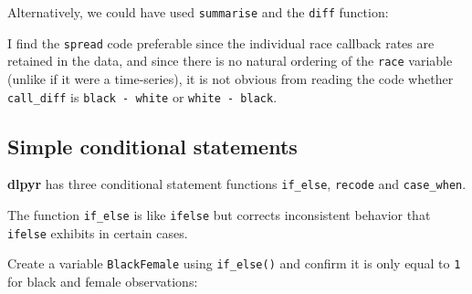 \documentclass[]{book}
\newenvironment{Shaded}{\begin{snugshade}}{\end{snugshade}}
\newcommand{\KeywordTok}[1]{\textcolor[rgb]{0.13,0.29,0.53}{\textbf{#1}}}
\newcommand{\DataTypeTok}[1]{\textcolor[rgb]{0.13,0.29,0.53}{#1}}
\newcommand{\DecValTok}[1]{\textcolor[rgb]{0.00,0.00,0.81}{#1}}
\newcommand{\StringTok}[1]{\textcolor[rgb]{0.31,0.60,0.02}{#1}}
\newcommand{\CommentTok}[1]{\textcolor[rgb]{0.56,0.35,0.01}{\textit{#1}}}
\newcommand{\OperatorTok}[1]{\textcolor[rgb]{0.81,0.36,0.00}{\textbf{#1}}}
\newcommand{\NormalTok}[1]{#1}
\theoremstyle{definition}
\theoremstyle{definition}
\theoremstyle{definition}
\theoremstyle{remark}
\begin{document}
Alternatively, we could have used \texttt{summarise} and the
\texttt{diff} function:

\begin{Shaded}
\end{Shaded}

I find the \texttt{spread} code preferable since the individual race
callback rates are retained in the data, and since there is no natural
ordering of the \texttt{race} variable (unlike if it were a
time-series), it is not obvious from reading the code whether
\texttt{call\_diff} is \texttt{black\ -\ white} or
\texttt{white\ -\ black}.

\subsection{Simple conditional
statements}\label{simple-conditional-statements}

\textbf{dlpyr} has three conditional statement functions
\texttt{if\_else}, \texttt{recode} and \texttt{case\_when}.

The function \texttt{if\_else} is like \texttt{ifelse} but corrects
inconsistent behavior that \texttt{ifelse} exhibits in certain cases.

Create a variable \texttt{BlackFemale} using \texttt{if\_else()} and
confirm it is only equal to \texttt{1} for black and female
observations:

\begin{Shaded}
\end{Shaded}
\end{document}
